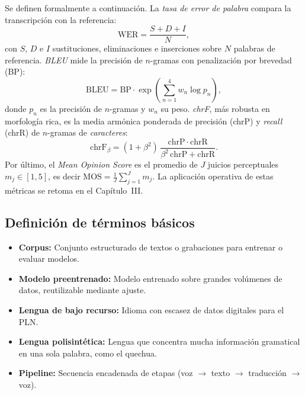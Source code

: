 \begin{bloqueNuevo}
\noindent Se definen formalmente a continuaci{\'o}n. La \emph{tasa de error de palabra} compara la
transcripci{\'o}n con la referencia:
\begin{equation}
\mathrm{WER} = \frac{S + D + I}{N},
\label{eq:wer}
\end{equation}
con $S$, $D$ e $I$ sustituciones, eliminaciones e inserciones sobre $N$ palabras de referencia.
\emph{BLEU} mide la precisi{\'o}n de $n$-gramas con penalizaci{\'o}n por brevedad (BP):
\begin{equation}
\mathrm{BLEU} = \mathrm{BP}\cdot\exp\!\left(\textstyle\sum_{n=1}^{4} w_n \log p_n\right),
\label{eq:bleu}
\end{equation}
donde $p_n$ es la precisi{\'o}n de $n$-gramas y $w_n$ su peso. \emph{chrF}, m{\'a}s robusta en
morfolog{\'i}a rica, es la media arm{\'o}nica ponderada de precisi{\'o}n (chrP) y \emph{recall} (chrR)
de $n$-gramas de \emph{caracteres}:
\begin{equation}
\mathrm{chrF}_{\beta} = (1 + \beta^{2})\,\frac{\mathrm{chrP}\cdot\mathrm{chrR}}{\beta^{2}\,\mathrm{chrP} + \mathrm{chrR}}.
\label{eq:chrf}
\end{equation}
Por {\'u}ltimo, el \emph{Mean Opinion Score} es el promedio de $J$ juicios perceptuales
$m_j \in [1,5]$, es decir $\mathrm{MOS} = \tfrac{1}{J}\sum_{j=1}^{J} m_j$. La aplicaci{\'o}n operativa
de estas m{\'e}tricas se retoma en el Cap{\'i}tulo~III.
\end{bloqueNuevo}

\subsection{Definici{\'o}n de t{\'e}rminos b{\'a}sicos}
\begin{itemize}
  \item \textbf{Corpus:} Conjunto estructurado de textos o grabaciones para entrenar o evaluar modelos.
  \item \textbf{Modelo preentrenado:} Modelo entrenado sobre grandes vol{\'u}menes de datos, reutilizable mediante ajuste.
  \item \textbf{Lengua de bajo recurso:} Idioma con escasez de datos digitales para el PLN.
  \item \textbf{Lengua polisint{\'e}tica:} Lengua que concentra mucha informaci{\'o}n gramatical en una sola palabra, como el quechua.
  \item \textbf{Pipeline:} Secuencia encadenada de etapas (voz $\to$ texto $\to$ traducci{\'o}n $\to$ voz).
\end{itemize}
